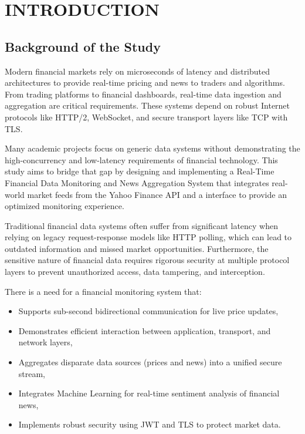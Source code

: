 \chapter{INTRODUCTION}
\section {Background of the Study}

Modern financial markets rely on microseconds of latency and distributed architectures to provide real-time pricing and news to traders and algorithms. From trading platforms to financial dashboards, real-time data ingestion and aggregation are critical requirements. These systems depend on robust Internet protocols like HTTP/2, WebSocket, and secure transport layers like TCP with TLS.

Many academic projects focus on generic data systems without demonstrating the high-concurrency and low-latency requirements of financial technology. This study aims to bridge that gap by designing and implementing a Real-Time Financial Data Monitoring and News Aggregation System that integrates real-world market feeds from the Yahoo Finance API and a interface to provide an optimized monitoring experience.

Traditional financial data systems often suffer from significant latency when relying on legacy request-response models like HTTP polling, which can lead to outdated information and missed market opportunities. Furthermore, the sensitive nature of financial data requires rigorous security at multiple protocol layers to prevent unauthorized access, data tampering, and interception.

There is a need for a financial monitoring system that:

\begin{itemize}
    \item Supports sub-second bidirectional communication for live price updates,
    \item Demonstrates efficient interaction between application, transport, and network layers,
    \item Aggregates disparate data sources (prices and news) into a unified secure stream,
    \item Integrates Machine Learning for real-time sentiment analysis of financial news,
    \item Implements robust security using JWT and TLS to protect market data.
\end{itemize}


